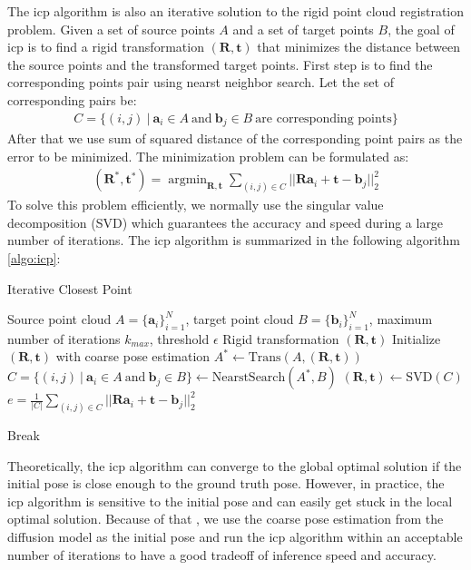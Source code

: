 \documentclass[12pt,DIV14,BCOR12mm,a4paper,footinclude=false,headinclude,parskip=half-,twoside,openright,cleardoublepage=empty,toc=index,bibliography=totoc,listof=totoc]{scrreprt}
\numberwithin{equation}{chapter}
\begin{document}
The \gls{icp} algorithm is also an iterative solution to the rigid point cloud registration problem. Given a set of source points $A$ and a set of target points $B$, the goal of \gls{icp} is to find a rigid transformation $(\mathbf{R},\mathbf{t})$ that minimizes the distance between the source points and the transformed target points. First step is to find the corresponding points pair using nearst neighbor search. Let the set of corresponding pairs be:
\begin{align}
  C = \{(i,j)\ \vert \ \mathbf{a}_{i}\in A \ \text{and} \ \mathbf{b}_{j}\in B \ \text{are corresponding points}\}
\end{align}
After that we use sum of squared distance of the corresponding point pairs as the error to be minimized. The minimization problem can be formulated as:
\begin{align}
  (\mathbf{R}^{*}, \mathbf{t}^{*})=\mathop{argmin}_{\mathbf{R},\mathbf{t}}\sum_{(i,j)\in C}||\mathbf{Ra}_{i}+\mathbf{t}-\mathbf{b}_{j}||_{2}^{2}
\end{align}
To solve this problem efficiently, we normally use the singular value decomposition (SVD) which guarantees the accuracy and speed during a large number of iterations. The \gls{icp} algorithm is summarized in the following algorithm \ref{algo:icp}:
\begin{algorithm}[h]
  \caption{Iterative Closest Point}
  \label{algo:icp}
  \begin{algorithmic}[1]
    \Require
      Source point cloud $A=\{\mathbf{a}_{i}\}_{i=1}^{N}$, target point cloud $B=\{\mathbf{b}_{i}\}_{i=1}^{N}$, maximum number of iterations $k_{max}$, threshold $\epsilon$
    \Ensure
      Rigid transformation $(\mathbf{R},\mathbf{t})$
    \State Initialize $(\mathbf{R},\mathbf{t})$ with coarse pose estimation
      \State $A^{*}\longleftarrow \text{Trans}(A, (\mathbf{R},\mathbf{t}))$
      \State $C=\{(i,j)\ \vert \ \mathbf{a}_{i}\in A \ \text{and} \ \mathbf{b}_{j}\in B \}\longleftarrow \text{NearstSearch}(A^{*}, B)$
      \State $(\mathbf{R}, \mathbf{t})\longleftarrow \text{SVD}(C)$
      \State $e = \frac{1}{\lvert C\rvert}\sum_{(i,j)\in C}||\mathbf{Ra}_{i}+\mathbf{t}-\mathbf{b}_{j}||_{2}^{2}$
      
        \State Break
      \EndIf
    \EndFor
  \end{algorithmic}
\end{algorithm}

Theoretically, the \gls{icp} algorithm can converge to the global optimal solution if the initial pose is close enough to the ground truth pose. However, in practice, the \gls{icp} algorithm is sensitive to the initial pose and can easily get stuck in the local optimal solution. Because of that , we use the coarse pose estimation from the diffusion model as the initial pose and run the \gls{icp} algorithm within an acceptable number of iterations to have a good tradeoff of inference speed and accuracy. 
\end{document}
